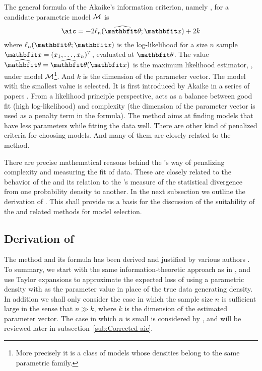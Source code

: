 The general formula of the Akaike's information criterion, namely \aic, for a
candidate parametric model $\mathcal{M}$ is
\begin{equation}
  \text{\aic} = -2\ell_n(\hbth;\bfx) + 2k
\end{equation}
where $\ell_n(\bth;\bfx)$ is the log-likelihood for a size $n$ sample
$\bfx=(x_1,\dots,x_n)^T$, evaluated at $\bth$. The value $\hbth = \hbth(\bfx)$
is the maximum likelihood estimator, \mle, under model $\mathcal{M}$\footnote{More
  precisely it is a class of models whose densities belong to the same
  parametric family.}. And $k$ is the dimension of the parameter vector. The
model with the smallest \aic value is selected. It is first introduced by
Akaike in a series of papers \parencite{Akaike1973, Akaike1974, Akaike1977,
  Akaike1981}. From a likelihood principle perspective, \aic acts as a balance
between good fit (high log-likelihood) and complexity (the dimension of the
parameter vector is used as a penalty term in the formula). The \aic method
aims at finding models that have less parameters while fitting the data well.
There are other kind of penalized criteria for choosing models. And many of
them are closely related to the \aic method.

There are precise mathematical reasons behind the \aic's way of penalizing
complexity and measuring the fit of data. These are closely related to the
behavior of the \mle and its relation to the \textcite{Kullback1951}'s measure
of the statistical divergence from one probability density to another. In the
next subsection we outline the derivation of \aic. This shall provide us a
basis for the discussion of the suitability of the \aic and related methods
for model selection.

\subsection{Derivation of \protect\aic}
\label{sub:Derivation of aic}

The \aic method and its formula has been derived and justified by various
authors \parencite[e.g.][]{Stone1982, Sawa1978, Chow1981, Bozdogan1987,
  Akaike1973, Claeskens2008}. To summary, we start with the same
information-theoretic approach as in \textcite{Akaike1973}, and use Taylor
expansions to approximate the expected loss of using a parametric density with
\mle as the parameter value in place of the true data generating density. In
addition we shall only consider the case in which the sample size $n$ is
sufficient large in the sense that $n\gg k$, where $k$ is the dimension of the
estimated parameter vector. The case in which $n$ is small is considered by
\textcite{Hurvich1989}, and will be reviewed later in
subsection~\ref{sub:Corrected aic}.


